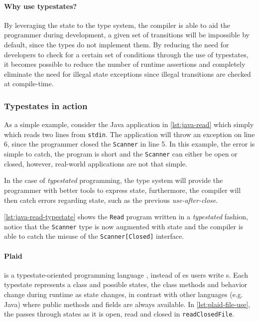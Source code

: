 \paragraph{Why use typestates?}
By leveraging the state to the type system, the compiler is able to aid the programmer during development,
a given set of transitions will be impossible by default, since the types do not implement them.
By reducing the need for developers to check for a certain set of conditions through the use of typestates,
it becomes possible to reduce the number of runtime assertions and
completely eliminate the need for illegal state exceptions since illegal transitions are checked at compile-time.


\subsubsection*{Typestates in action}

As a simple example, consider the Java application in \autoref{lst:java-read} which simply which reads two lines from \texttt{stdin}.
The application will throw an exception on line 6,
since the programmer closed the \texttt{Scanner} in line 5.
In this example, the error is simple to catch,
the program is short and the \texttt{Scanner} can either be open or closed,
however, real-world applications are not that simple.



In the case of \emph{typestated} programming,
the type system will provide the programmer with better tools to express state,
furthermore, the compiler will then catch errors regarding state,
such as the previous \emph{use-after-close}.

\autoref{lst:java-read-typestate} shows the \texttt{Read} program written in a \emph{typestated} fashion,
notice that the \texttt{Scanner} type is now augmented with state and
the compiler is able to catch the misuse of the \texttt{Scanner[Closed]} interface.



\paragraph{Plaid} is a typestate-oriented programming language \autocite{Aldrich2009},
instead of es users write s.
Each typestate represents a class and possible states,
the class methods and behavior change during runtime as state changes,
in contrast with other languages (e.g. Java) where public methods and fields are always available.
In \autoref{lst:plaid-file-use}, the  passes through states as it is open, read and closed in \texttt{readClosedFile}.

